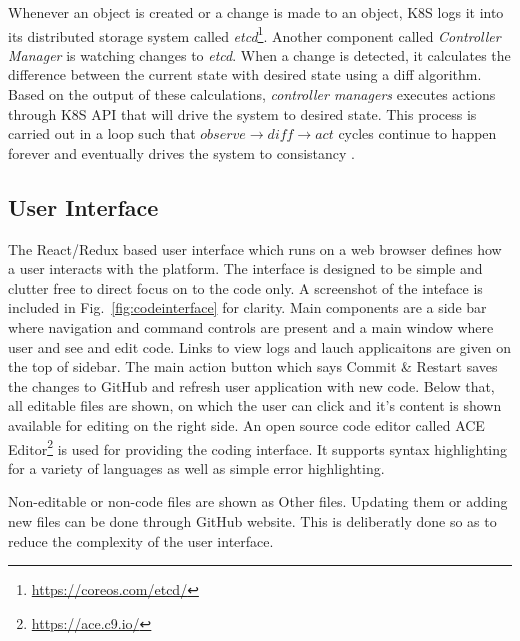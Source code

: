 \documentclass[DD]{iitmdiss}
\begin{document}
Whenever an object is created or a change is made to an object, K8S logs it into its distributed storage system called \textit{etcd}\footnote{\url{https://coreos.com/etcd/}}. Another component called \textit{Controller Manager} is watching changes to \textit{etcd}. When a change is detected, it calculates the difference between the current state with desired state using a diff algorithm. Based on the output of these calculations, \textit{controller managers} executes actions through K8S API that will drive the system to desired state. This process is carried out in a loop such that $observe \rightarrow diff \rightarrow act$ cycles continue to happen forever and eventually drives the system to consistancy \citep{vogels_eventually_2009}.

\subsection{User Interface}
The React/Redux based user interface which runs on a web browser defines how a user interacts with the platform. The interface is designed to be simple and clutter free to direct focus on to the code only. A screenshot of the inteface is included in Fig.~\ref{fig:codeinterface} for clarity. Main components are a side bar where navigation and command controls are present and a main window where user and see and edit code. Links to view logs and lauch applicaitons are given on the top of sidebar. The main action button which says Commit \& Restart saves the changes to GitHub and refresh user application with new code. Below that, all editable files are shown, on which the user can click and it's content is shown available for editing on the right side. An open source code editor called ACE Editor\footnote{\url{https://ace.c9.io/}} is used for providing the coding interface. It supports syntax highlighting for a variety of languages as well as simple error highlighting.

Non-editable or non-code files are shown as Other files. Updating them or adding new files can be done through GitHub website. This is deliberatly done so as to reduce the complexity of the user interface.
\end{document}
